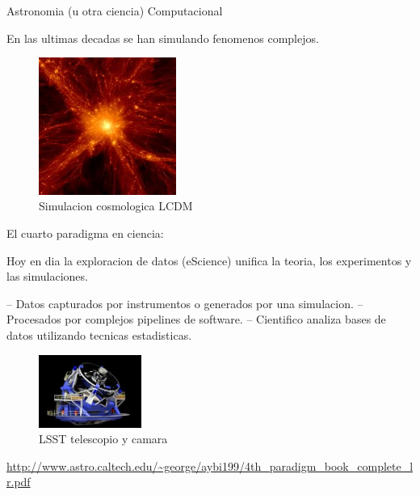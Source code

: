 \documentclass[ignorenonframetext,]{beamer}
\begin{document}
\begin{frame}{Astronomia (u otra ciencia) Computacional}

En las ultimas decadas se han simulando fenomenos complejos.

\begin{figure}
\centering
\includegraphics[width=0.40000\textwidth]{lcdm.jpeg}
\caption{Simulacion cosmologica LCDM}
\end{figure}

\end{frame}

\begin{frame}{El cuarto paradigma en ciencia:}

Hoy en dia la exploracion de datos (eScience) unifica la teoria, los
experimentos y las simulaciones.

-- Datos capturados por instrumentos o generados por una simulacion. --
Procesados por complejos pipelines de software. -- Cientifico analiza
bases de datos utilizando tecnicas estadisticas.

\begin{figure}
\centering
\includegraphics[width=0.30000\textwidth]{lsst.jpeg}
\caption{LSST telescopio y camara}
\end{figure}

\url{http://www.astro.caltech.edu/~george/aybi199/4th_paradigm_book_complete_lr.pdf}

\end{frame}
\end{document}
